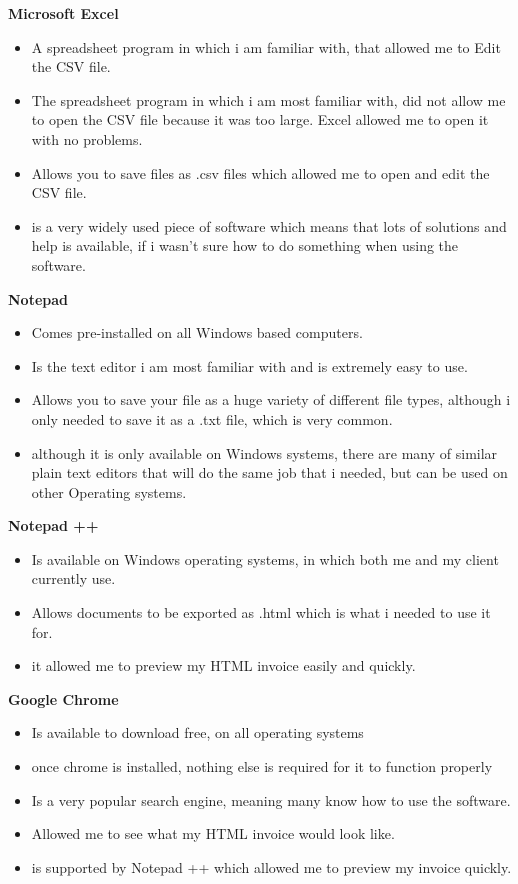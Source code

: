 \textbf{Microsoft Excel}
\begin{itemize}
	\item A spreadsheet program in which i am familiar with, that allowed me to Edit the CSV file.
	\item The spreadsheet program in which i am most familiar with, did not allow me to open the CSV file because it was too large. Excel allowed me to open it with no problems.
	\item Allows you to save files as .csv files which allowed me to open and edit the CSV file.
	\item is a very widely used piece of software which means that lots of solutions and help is available, if i wasn't sure how to do something when using the software.
\end{itemize}
\vspace{5mm}


\textbf{Notepad}
\begin{itemize}
	\item Comes pre-installed on all Windows based computers.
	\item Is the text editor i am most familiar with and is extremely easy to use.
	\item Allows you to save your file as a huge variety of different file types, although i only needed to save it as a .txt file, which is very common.
	\item although it is only available on Windows systems, there are many of similar plain text editors that will do the same job that i needed, but can be used on other Operating systems.
\end{itemize}
\vspace{5mm}

\pagebreak

\textbf{Notepad ++}
\begin{itemize}
	\item Is available on Windows operating systems, in which both me and my client currently use.
	\item Allows documents to be exported as .html which is what i needed to use it for.
	\item it allowed me to preview my HTML invoice easily and quickly.
\end{itemize}
\vspace{5mm}


\textbf{Google Chrome}
\begin{itemize}
	\item Is available to download free, on all operating systems
	\item once chrome is installed, nothing else is required for it to function properly
	\item Is a very popular search engine, meaning many know how to use the software.
	\item Allowed me to see what my HTML invoice would look like.
	\item is supported by Notepad ++ which allowed me to preview my invoice quickly.
\end{itemize}
\vspace{5mm}


